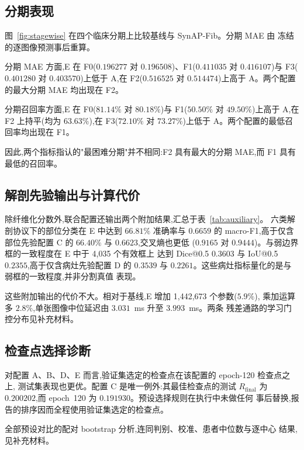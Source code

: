 \subsection{分期表现}

图~\ref{fig:stagewise} 在四个临床分期上比较基线与 SynAP-Fib。分期 MAE 由
冻结的逐图像预测事后重算。

分期 MAE 方面,E 在 F0($0.196277$ 对 $0.196508$)、F1($0.411035$ 对
$0.416107$)与 F3($0.401280$ 对 $0.403570$)上低于 A,在 F2($0.516525$
对 $0.514474$)上高于 A。两个配置的最大分期 MAE 均出现在 F2。

分期召回率方面,E 在 F0($81.14\%$ 对 $80.18\%$)与 F1($50.50\%$ 对
$49.50\%$)上高于 A,在 F2 上持平(均为 $63.63\%$),在 F3($72.10\%$ 对
$73.27\%$)上低于 A。两个配置的最低召回率均出现在 F1。

因此,两个指标指认的"最困难分期"并不相同:F2 具有最大的分期 MAE,而 F1
具有最低的召回率。

\subsection{解剖先验输出与计算代价}

除纤维化分数外,联合配置还输出两个附加结果,汇总于表~\ref{tab:auxiliary}。
六类解剖协议下的部位分类在 E 中达到 $66.81\%$ 准确率与 $0.6659$ 的
macro-F1,高于仅含部位先验配置 C 的 $66.40\%$ 与 $0.6623$,交叉熵也更低
($0.9165$ 对 $0.9444$)。与弱边界框的一致程度在 E 中于 4,035 个有效框上
达到 Dice@0.5 $0.3603$ 与 IoU@0.5 $0.2355$,高于仅含病灶先验配置 D 的
$0.3539$ 与 $0.2261$。这些病灶指标量化的是与弱框的一致程度,并非分割真值
表现。

这些附加输出的代价不大。相对于基线,E 增加 1,442,673 个参数($5.9\%$),
乘加运算多 $2.8\%$,单张图像中位延迟由 $3.031$~ms 升至 $3.993$~ms。两条
残差通路的学习门控分布见补充材料。

\subsection{检查点选择诊断}

对配置 A、B、D、E 而言,验证集选定的检查点在该配置的 epoch-120 检查点之上,
测试集表现也更优。配置 C 是唯一例外:其最佳检查点的测试 $R_{\mathrm{final}}$
为 $0.200202$,而 epoch~120 为 $0.191930$。预设选择规则在执行中未做任何
事后替换,报告的排序因而全程使用验证集选定的检查点。

全部预设对比的配对 bootstrap 分析,连同判别、校准、患者中位数与逐中心
结果,见补充材料。
